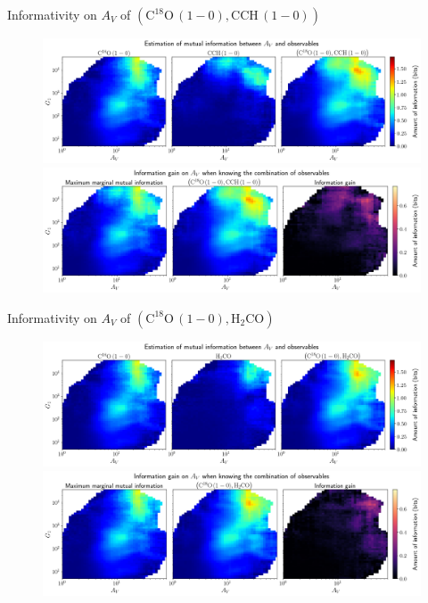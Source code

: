 \documentclass{beamer}
\begin{document}
\begin{frame}{Informativity on $A_V$ of $\left(\mathrm{C^{18}O\,(1-0)},\mathrm{CCH\,(1-0)}\right)$}
    \begin{figure}
        \centering
        \includegraphics[width=0.95\linewidth]{../mi/av__c18o10_cch10_mi.png}
        \vfill
        \includegraphics[width=0.95\linewidth]{../mi/av__c18o10_cch10_mi_gain.png}
    \end{figure}
\end{frame}

\begin{frame}{Informativity on $A_V$ of $\left(\mathrm{C^{18}O\,(1-0)},\mathrm{H_2CO}\right)$}
    \begin{figure}
        \centering
        \includegraphics[width=0.95\linewidth]{../mi/av__c18o10_h2co_mi.png}
        \vfill
        \includegraphics[width=0.95\linewidth]{../mi/av__c18o10_h2co_mi_gain.png}
    \end{figure}
\end{frame}
\end{document}
